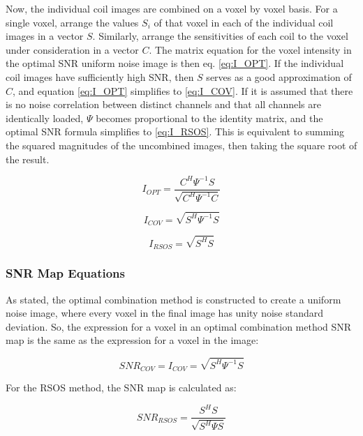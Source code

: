Now, the individual coil images are combined on a voxel by voxel basis. For a
single voxel, arrange the values $S_i$ of that voxel in each of the individual coil images in a vector $S$.  Similarly,
arrange the sensitivities of each coil to the voxel under consideration in a vector $C$. The matrix equation for the
voxel intensity in the optimal SNR uniform noise image is then eq. \ref{eq:I_OPT}. If the individual coil images have
sufficiently high SNR, then $S$ serves as a good approximation of $C$, and equation \ref{eq:I_OPT} simplifies to \ref{eq:I_COV}.  If it
is assumed that there is no noise correlation between distinct channels and that all channels are identically loaded,
$\Psi$ becomes proportional to the identity matrix, and the optimal SNR formula simplifies to \ref{eq:I_RSOS}. This is
equivalent to summing the squared magnitudes of the uncombined images, then taking the square root of the result.

\begin{equation} \label{eq:I_OPT}
I_{OPT}=\frac{C^H\Psi^{-1}S}{\sqrt{C^H\Psi^{-1}C}}
\end{equation}

\begin{equation} \label{eq:I_COV}
I_{COV}=\sqrt{S^H\Psi^{-1}S}
\end{equation}

\begin{equation} \label{eq:I_RSOS}
I_{RSOS}=\sqrt{S^{H} S}
\end{equation}

\subsubsection{SNR Map Equations}

As stated, the optimal combination method is constructed to create a uniform noise image, where every voxel in the final
image has unity noise standard deviation. So, the expression for a voxel in an optimal combination method SNR map is the
same as the expression for a voxel in the image:

\begin{equation} \label{eq:SNR_COV}
    SNR_{COV}= I_{COV} = \sqrt{S^H\Psi^{-1}S}
\end{equation}

For the RSOS method, the SNR map is calculated as:

\begin{equation} \label{eq:SNR_RSOS}
    SNR_{RSOS}= \frac{S^HS}{\sqrt{S^H \Psi S}}
\end{equation}

